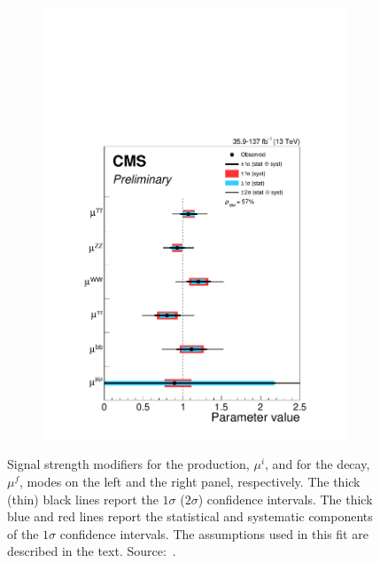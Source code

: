 \begin{figure}[htbp]
\begin{subfigure}[htbp]{0.48\textwidth}
    \includegraphics[width=\textwidth]{figures_and_tables/theory/signal_strength_modifier_decay.pdf}
    \caption{ }
    \label{signal_strength_modifier_decay}
  \end{subfigure}
  \caption{ Signal strength modifiers for the production, $\mu^{i}$, and for the decay, $\mu^{f}$, modes on the left and the right panel, respectively. The thick (thin) black lines report the $1\sigma$ ($2\sigma$) confidence intervals. The thick blue and red lines report the statistical and systematic components of the $1\sigma$ confidence intervals. The assumptions used in this fit are described in the text. Source:~\cite{cms_higgs_comb_run2}.}
\end{figure}





